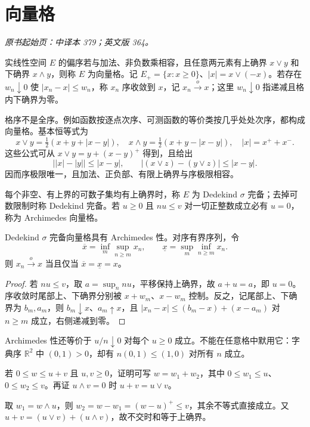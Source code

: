 \section{向量格}\label{sec:yosida-12-02}
\noindent\textit{原书起始页：中译本 379；英文版 364。}

\begin{definition}[格序与序收敛]
实线性空间 $E$ 的偏序若与加法、非负数乘相容，且任意两元素有上确界 $x\vee y$ 和下确界 $x\wedge y$，则称 $E$ 为向量格。记 $E_+=\{x:x\ge0\}$、$|x|=x\vee(-x)$。若存在 $w_n\downarrow0$ 使 $|x_n-x|\le w_n$，称 $x_n$ 序收敛到 $x$，记 $x_n\xrightarrow{o}x$；这里 $w_n\downarrow0$ 指递减且格内下确界为零。
\end{definition}

格序不是全序。例如函数按逐点次序、可测函数的等价类按几乎处处次序，都构成向量格。基本恒等式为
\[
 x\vee y=\tfrac12(x+y+|x-y|),\quad
 x\wedge y=\tfrac12(x+y-|x-y|),\quad |x|=x^++x^-.
\]
这些公式可从 $x\vee y=y+(x-y)^+$ 得到，且给出
\[
 \bigl||x|-|y|\bigr|\le|x-y|,\qquad
 |(x\vee z)-(y\vee z)|\le|x-y|.
\]
因而序极限唯一，且加法、正负部、有限上确界与序极限相容。

\begin{definition}
每个非空、有上界的可数子集均有上确界时，称 $E$ 为 Dedekind $\sigma$ 完备；去掉可数限制时称 Dedekind 完备。若 $u\ge0$ 且 $nu\le v$ 对一切正整数成立必有 $u=0$，称为 Archimedes 向量格。
\end{definition}

\begin{proposition}[序极限的判别]\label{prop:y12-order-limit}
Dedekind $\sigma$ 完备向量格具有 Archimedes 性。对序有界序列，令
\[
 \overline x=\inf_m\sup_{n\ge m}x_n,\qquad
 \underline x=\sup_m\inf_{n\ge m}x_n.
\]
则 $x_n\xrightarrow{o}x$ 当且仅当 $\overline x=\underline x=x$。
\end{proposition}
\begin{proof}
若 $nu\le v$，取 $a=\sup_n nu$，平移保持上确界，故 $a+u=a$，即 $u=0$。序收敛时尾部上、下确界分别被 $x+w_m$、$x-w_m$ 控制。反之，记尾部上、下确界为 $b_m,a_m$，则 $b_m\downarrow x$、$a_m\uparrow x$，且 $|x_n-x|\le(b_m-x)+(x-a_m)$ 对 $n\ge m$ 成立，右侧递减到零。
\end{proof}

Archimedes 性还等价于 $u/n\downarrow0$ 对每个 $u\ge0$ 成立。不能在任意格中默用它：字典序 $\mathbb R^2$ 中 $(0,1)>0$，却有 $n(0,1)\le(1,0)$ 对所有 $n$ 成立。

\begin{exercise}[Riesz 分解]\label{ex:y12-riesz-decomposition}
若 $0\le w\le u+v$ 且 $u,v\ge0$，证明可写 $w=w_1+w_2$，其中 $0\le w_1\le u$、$0\le w_2\le v$。再证 $u\wedge v=0$ 时 $u+v=u\vee v$。
\end{exercise}
\begin{solution}
取 $w_1=w\wedge u$，则 $w_2=w-w_1=(w-u)^+\le v$，其余不等式直接成立。又 $u+v=(u\vee v)+(u\wedge v)$，故不交时和等于上确界。
\end{solution}

